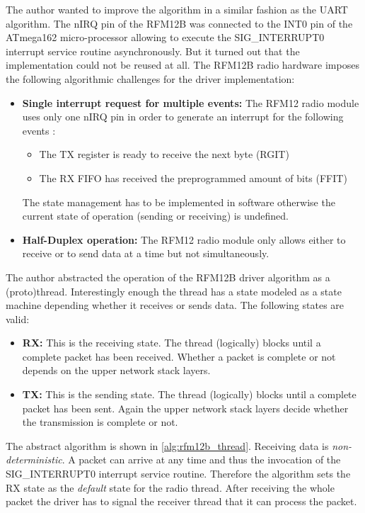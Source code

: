 The author wanted to improve the algorithm in a similar fashion as the UART algorithm. The nIRQ pin of the RFM12B was connected to the INT0 pin of the ATmega162 micro-processor allowing to execute the SIG\_INTERRUPT0 interrupt service routine asynchronously. But it turned out that the implementation could not be reused at all. The RFM12B radio hardware imposes the following algorithmic challenges for the driver implementation:

\begin{itemize}
    \item \textbf{Single interrupt request for multiple events:} The RFM12 radio module uses only one nIRQ pin in order to generate an interrupt for the following events \cite{sis4221_datasheet}:
\begin{itemize}
    \item The TX register is ready to receive the next byte (RGIT)
    \item The RX FIFO has received the preprogrammed amount of bits (FFIT)
\end{itemize}
The state management has to be implemented in software otherwise the current state of operation (sending or receiving) is undefined.
    \item \textbf{Half-Duplex operation:} The RFM12 radio module only allows either to receive or to send data at a time but not simultaneously.
\end{itemize}

The author abstracted the operation of the RFM12B driver algorithm as a (proto)thread. Interestingly enough the thread has a state modeled as a state machine depending whether it receives or sends data. The following states are valid:

\begin{itemize}
    \item \textbf{RX:} This is the receiving state. The thread (logically) blocks until a complete packet has been received. Whether a packet is complete or not depends on the upper network stack layers.
    \item \textbf{TX:} This is the sending state. The thread (logically) blocks until a complete packet has been sent. Again the upper network stack layers decide whether the transmission is complete or not.
\end{itemize}

The abstract algorithm is shown in \ref{alg:rfm12b_thread}. Receiving data is \emph{non-deterministic}. A packet can arrive at any time and thus the invocation of the SIG\_INTERRUPT0 interrupt service routine. Therefore the algorithm sets the RX state as the \emph{default} state for the radio thread. After receiving the whole packet the driver has to signal the receiver thread that it can process the packet.

